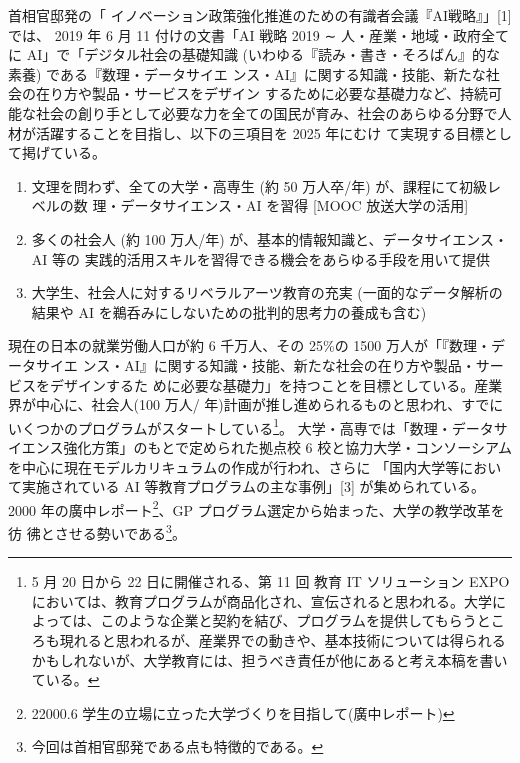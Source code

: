 \documentclass[
]{book}
\theoremstyle{definition}
\theoremstyle{definition}
\theoremstyle{definition}
\theoremstyle{definition}
\theoremstyle{remark}
\begin{document}
首相官邸発の「 イノベーション政策強化推進のための有識者会議『AI戦略』」{[}1{]} では、 2019 年 6 月 11 付けの文書「AI 戦略 2019 ∼ 人・産業・地域・政府全てに AI」で「デジタル社会の基礎知識 (いわゆる『読み・書き・そろばん』的な素養) である『数理・データサイエ ンス・AI』に関する知識・技能、新たな社会の在り方や製品・サービスをデザイン するために必要な基礎力など、持続可能な社会の創り手として必要な力を全ての国民が育み、社会のあらゆる分野で人材が活躍することを目指し、以下の三項目を 2025 年にむけ て実現する目標として掲げている。

\begin{enumerate}
\def\labelenumi{\arabic{enumi}.}
\item
  文理を問わず、全ての大学・高専生 (約 50 万人卒/年) が、課程にて初級レベルの数 理・データサイエンス・AI を習得 {[}MOOC 放送大学の活用{]}
\item
  多くの社会人 (約 100 万人/年) が、基本的情報知識と、データサイエンス・AI 等の 実践的活用スキルを習得できる機会をあらゆる手段を用いて提供
\item
  大学生、社会人に対するリベラルアーツ教育の充実 (一面的なデータ解析の結果や AI を鵜呑みにしないための批判的思考力の養成も含む)
\end{enumerate}

現在の日本の就業労働人口が約 6 千万人、その 25\%の 1500 万人が「『数理・データサイエ ンス・AI』に関する知識・技能、新たな社会の在り方や製品・サービスをデザインするた めに必要な基礎力」を持つことを目標としている。産業界が中心に、社会人(100 万人/ 年)計画が推し進められるものと思われ、すでにいくつかのプログラムがスタートしている\footnote{5 月 20 日から 22 日に開催される、第 11 回 教育 IT ソリューション EXPO においては、教育プログラムが商品化され、宣伝されると思われる。大学によっては、このような企業と契約を結び、プログラムを提供してもらうところも現れると思われるが、産業界での動きや、基本技術については得られるかもしれないが、大学教育には、担うべき責任が他にあると考え本稿を書いている。}。
大学・高専では「数理・データサイエンス強化方策」のもとで定められた拠点校 6 校と協力大学・コンソーシアムを中心に現在モデルカリキュラムの作成が行われ、さらに
「国内大学等において実施されている AI 等教育プログラムの主な事例」{[}3{]} が集められている。2000 年の廣中レポート\footnote{22000.6 学生の立場に立った大学づくりを目指して(廣中レポート)}、GP プログラム選定から始まった、大学の教学改革を彷 彿とさせる勢いである\footnote{今回は首相官邸発である点も特徴的である。}。
\end{document}
